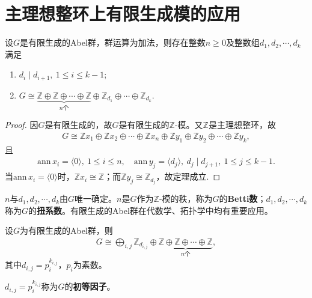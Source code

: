\documentclass[../../main.tex]{subfiles}%
\begin{document}
\section{主理想整环上有限生成模的应用}

\begin{theorem}
设$G$是有限生成的Abel群，群运算为加法，则存在整数$n\geqslant0$及整数组$d_1,d_2,\cdots,d_k$满足
\begin{enumerate}[(1)]
\item $d_i\mid d_{i+1},\ 1\leqslant i\leqslant k-1$;
\item $G\cong \underbrace{\mathbb{Z}\oplus\mathbb{Z}\oplus\cdots\oplus\mathbb{Z}}_{n\text{个}}\oplus\mathbb{Z}_{d_1}\oplus\cdots\oplus\mathbb{Z}_{d_k}$.
\end{enumerate}
\end{theorem}
\begin{proof}

因$G$是有限生成的，故$G$是有限生成的$\mathbb{Z}$-模。又$\mathbb{Z}$是主理想整环，故
\begin{align*}
G\cong \mathbb{Z}x_1\oplus\mathbb{Z}x_2\oplus\cdots\oplus\mathbb{Z}x_n\oplus\mathbb{Z}y_1\oplus\mathbb{Z}y_2\oplus\cdots\oplus\mathbb{Z}y_k,
\end{align*}
且
\begin{align*}
\mathrm{ann}\,x_i=\langle0\rangle,\ 1\leqslant i\leqslant n,\quad \mathrm{ann}\,y_j=\langle d_j\rangle,\ d_j\mid d_{j+1},\ 1\leqslant j\leqslant k-1.
\end{align*}
当$\mathrm{ann}\,x_i=\langle0\rangle$时，$\mathbb{Z}x_i\cong\mathbb{Z}$；而$\mathbb{Z}y_j\cong\mathbb{Z}_{d_j}$，故定理成立.

\end{proof}
\begin{remark}
$n$与$d_1,d_2,\cdots,d_k$由$G$唯一确定。$n$是$G$作为$\mathbb{Z}$-模的秩，称为$G$的\textbf{Betti数}；$d_1,d_2,\cdots,d_k$称为$G$的\textbf{扭系数}。有限生成的Abel群在代数学、拓扑学中均有重要应用。
\end{remark}

\begin{theorem}
设$G$为有限生成的Abel群，则
\begin{align*}
G\cong \bigoplus_{i,j}\mathbb{Z}_{d_{i,j}}\oplus\underbrace{\mathbb{Z}\oplus\mathbb{Z}\oplus\cdots\oplus\mathbb{Z}}_{n\text{个}},
\end{align*}
其中$d_{i,j}=p_i^{k_{i,j}}$，$p_i$为素数。
\end{theorem}
\begin{remark}
$d_{i,j}=p_i^{k_{i,j}}$称为$G$的\textbf{初等因子}。
\end{remark}
\end{document}
